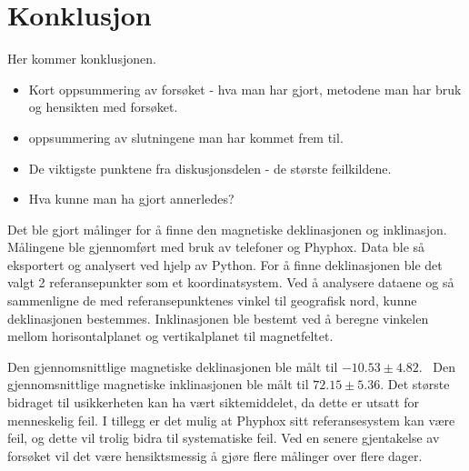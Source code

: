 \section{Konklusjon}
Her kommer konklusjonen.

\begin{itemize}
    \item Kort oppsummering av forsøket - hva man har gjort, metodene man har bruk og hensikten med forsøket. 
    \item oppsummering av slutningene man har kommet frem til.
    \item De viktigste punktene fra diskusjonsdelen - de største feilkildene. 
    \item Hva kunne man ha gjort annerledes?
\end{itemize}

Det ble gjort målinger for å finne den magnetiske deklinasjonen og inklinasjon. Målingene ble gjennomført med bruk av telefoner og Phyphox. Data ble så eksportert og analysert ved hjelp av Python. For å finne deklinasjonen ble det valgt 2 referansepunkter som et koordinatsystem. Ved å analysere dataene og så sammenligne de med referansepunktenes vinkel til geografisk nord, kunne deklinasjonen bestemmes. Inklinasjonen ble bestemt ved å beregne vinkelen mellom horisontalplanet og vertikalplanet til magnetfeltet. 

Den gjennomsnittlige magnetiske deklinasjonen ble målt til $-10.53 \pm 4.82$\textdegree. \ Den gjennomsnittlige magnetiske inklinasjonen ble målt til $72.15\pm5.36$\textdegree. Det største bidraget til usikkerheten kan ha vært siktemiddelet, da dette er utsatt for menneskelig feil. I tillegg er det mulig at Phyphox sitt referansesystem kan være feil, og dette vil trolig bidra til systematiske feil. Ved en senere gjentakelse av forsøket vil det være hensiktsmessig å gjøre flere målinger over flere dager.     
